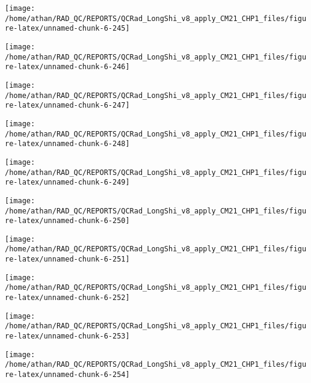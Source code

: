 \documentclass[
  10pt,
  a4paper,oneside]{article}
\begin{document}
\begin{center}\texttt{[image: /home/athan/RAD\_QC/REPORTS/QCRad\_LongShi\_v8\_apply\_CM21\_CHP1\_files/figure-latex/unnamed-chunk-6-245]} \end{center}

\begin{center}\texttt{[image: /home/athan/RAD\_QC/REPORTS/QCRad\_LongShi\_v8\_apply\_CM21\_CHP1\_files/figure-latex/unnamed-chunk-6-246]} \end{center}

\begin{center}\texttt{[image: /home/athan/RAD\_QC/REPORTS/QCRad\_LongShi\_v8\_apply\_CM21\_CHP1\_files/figure-latex/unnamed-chunk-6-247]} \end{center}

\begin{center}\texttt{[image: /home/athan/RAD\_QC/REPORTS/QCRad\_LongShi\_v8\_apply\_CM21\_CHP1\_files/figure-latex/unnamed-chunk-6-248]} \end{center}

\begin{center}\texttt{[image: /home/athan/RAD\_QC/REPORTS/QCRad\_LongShi\_v8\_apply\_CM21\_CHP1\_files/figure-latex/unnamed-chunk-6-249]} \end{center}

\begin{center}\texttt{[image: /home/athan/RAD\_QC/REPORTS/QCRad\_LongShi\_v8\_apply\_CM21\_CHP1\_files/figure-latex/unnamed-chunk-6-250]} \end{center}

\begin{center}\texttt{[image: /home/athan/RAD\_QC/REPORTS/QCRad\_LongShi\_v8\_apply\_CM21\_CHP1\_files/figure-latex/unnamed-chunk-6-251]} \end{center}

\begin{center}\texttt{[image: /home/athan/RAD\_QC/REPORTS/QCRad\_LongShi\_v8\_apply\_CM21\_CHP1\_files/figure-latex/unnamed-chunk-6-252]} \end{center}

\begin{center}\texttt{[image: /home/athan/RAD\_QC/REPORTS/QCRad\_LongShi\_v8\_apply\_CM21\_CHP1\_files/figure-latex/unnamed-chunk-6-253]} \end{center}

\begin{center}\texttt{[image: /home/athan/RAD\_QC/REPORTS/QCRad\_LongShi\_v8\_apply\_CM21\_CHP1\_files/figure-latex/unnamed-chunk-6-254]} \end{center}
\end{document}

